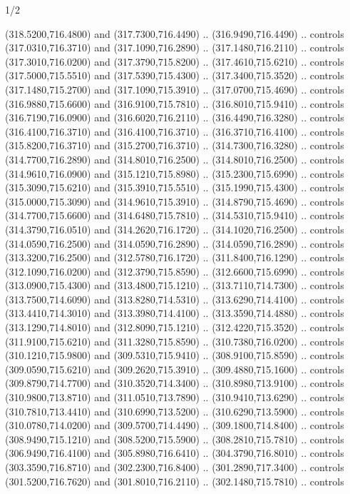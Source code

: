 \begin{flagdescription}{1/2}
\begin{scope}[xshift=0.5\flaglength]
\begin{scope}[scale=0.00745\flagwidth,xshift=-12.1mm,yshift=41.7mm]
\begin{scope}[y=0.80pt, x=0.80pt, yscale=-1, xscale=1, inner sep=0pt, outer sep=0pt]
\begin{scope}[cm={{1.33333,0.0,0.0,-1.33333,(0.0,114.66667)}}]
\begin{scope}[scale=0.100]
  (318.5200,716.4800) and (317.7300,716.4490) .. (316.9490,716.4490) .. controls
  (317.0310,716.3710) and (317.1090,716.2890) .. (317.1480,716.2110) .. controls
  (317.3010,716.0200) and (317.3790,715.8200) .. (317.4610,715.6210) .. controls
  (317.5000,715.5510) and (317.5390,715.4300) .. (317.3400,715.3520) .. controls
  (317.1480,715.2700) and (317.1090,715.3910) .. (317.0700,715.4690) .. controls
  (316.9880,715.6600) and (316.9100,715.7810) .. (316.8010,715.9410) .. controls
  (316.7190,716.0900) and (316.6020,716.2110) .. (316.4490,716.3280) .. controls
  (316.4100,716.3710) and (316.4100,716.3710) .. (316.3710,716.4100) .. controls
  (315.8200,716.3710) and (315.2700,716.3710) .. (314.7300,716.3280) .. controls
  (314.7700,716.2890) and (314.8010,716.2500) .. (314.8010,716.2500) .. controls
  (314.9610,716.0900) and (315.1210,715.8980) .. (315.2300,715.6990) .. controls
  (315.3090,715.6210) and (315.3910,715.5510) .. (315.1990,715.4300) .. controls
  (315.0000,715.3090) and (314.9610,715.3910) .. (314.8790,715.4690) .. controls
  (314.7700,715.6600) and (314.6480,715.7810) .. (314.5310,715.9410) .. controls
  (314.3790,716.0510) and (314.2620,716.1720) .. (314.1020,716.2500) .. controls
  (314.0590,716.2500) and (314.0590,716.2890) .. (314.0590,716.2890) .. controls
  (313.3200,716.2500) and (312.5780,716.1720) .. (311.8400,716.1290) .. controls
  (312.1090,716.0200) and (312.3790,715.8590) .. (312.6600,715.6990) .. controls
  (313.0900,715.4300) and (313.4800,715.1210) .. (313.7110,714.7300) .. controls
  (313.7500,714.6090) and (313.8280,714.5310) .. (313.6290,714.4100) .. controls
  (313.4410,714.3010) and (313.3980,714.4100) .. (313.3590,714.4880) .. controls
  (313.1290,714.8010) and (312.8090,715.1210) .. (312.4220,715.3520) .. controls
  (311.9100,715.6210) and (311.3280,715.8590) .. (310.7380,716.0200) .. controls
  (310.1210,715.9800) and (309.5310,715.9410) .. (308.9100,715.8590) .. controls
  (309.0590,715.6210) and (309.2620,715.3910) .. (309.4880,715.1600) .. controls
  (309.8790,714.7700) and (310.3520,714.3400) .. (310.8980,713.9100) .. controls
  (310.9800,713.8710) and (311.0510,713.7890) .. (310.9410,713.6290) .. controls
  (310.7810,713.4410) and (310.6990,713.5200) .. (310.6290,713.5900) .. controls
  (310.0780,714.0200) and (309.5700,714.4490) .. (309.1800,714.8400) .. controls
  (308.9490,715.1210) and (308.5200,715.5900) .. (308.2810,715.7810) .. controls
  (306.9490,716.4100) and (305.8980,716.6410) .. (304.3790,716.8010) .. controls
  (303.3590,716.8710) and (302.2300,716.8400) .. (301.2890,717.3400) .. controls
  (301.5200,716.7620) and (301.8010,716.2110) .. (302.1480,715.7810) .. controls

\end{scope}
\end{scope}
\end{scope}
\end{scope}
\end{scope}
\end{flagdescription}
